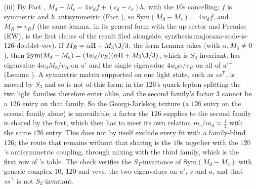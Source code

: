 (iii) By Fact , $M_{d} - M_{e} = 4w_{d}f + (c_{d} - c_{e})h$, with the $10$s cancelling; $f$ is symmetric and $h$ antisymmetric (Fact ), so $\mathrm{Sym}(M_{d} - M_{e}) = 4w_{d}f$, and $M_{R} = v_{R}f$ (the same lemma, in its general form with the up sector and Premise (EW), is the first clause of the result filed alongside, synthesis.majorana-scale-is-126-doublet-vev). If $M_{R} = \alpha\Pi + M_{3}\J/3$, the form Lemma  takes (with $\alpha, M_{3} \neq 0$), then $\mathrm{Sym}(M_{d} - M_{e}) = (4w_{d}/v_{R})(\alpha\Pi + M_{3}\J/3)$, which is $S_{3}$-invariant, has eigenvalue $4w_{d}M_{3}/v_{R}$ on $u'$ and the single eigenvalue $4w_{d}\alpha/v_{R}$ on all of $u'^{\perp}$ (Lemma ). A symmetric matrix supported on one light state, such as $ss^{\mathsf{T}}$, is moved by $S_{3}$ and so is not of this form; in the $126$'s quark-lepton splitting the two light families therefore enter alike, and the second family's factor $3$ cannot be a $126$ entry on that family. So the Georgi-Jarlskog texture (a $126$ entry on the second family alone) is unavailable; a factor the $126$ supplies to the second family is shared by the first, which then has to meet its own relation $m_{e}/m_{d} \approx \tfrac13$ with the same $126$ entry. This does not by itself exclude every fit with a family-blind $126$; the route that remains without that sharing is the $10$s together with the $120$'s antisymmetric coupling, through mixing with the third family, which is the first row of 's table. The check verifies the $S_{3}$-invariance of $\mathrm{Sym}(M_{d} - M_{e})$ with generic complex $10$, $120$ and vevs, the two eigenvalues on $u'$, $s$ and $a$, and that $ss^{\mathsf{T}}$ is not $S_{3}$-invariant.
